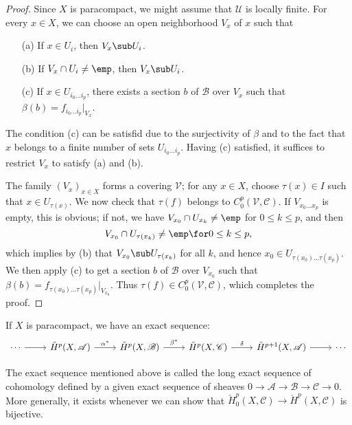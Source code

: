 \begin{proof}
Since $X$ is paracompact, we might assume that $\mathcal{U}$ is locally finite. For every $x\in X$, we can choose an open neighborhood $V_x$ of $x$ such that
\begin{itemize}
\item[(a)] If $x\in U_i$, then $V_x\sub U_i$.
\item[(b)] If $V_x\cap U_i\neq\emp$, then $V_x\sub U_i$.
\item[(c)] If $x\in U_{i_0\dots i_p}$, there exists a section $b$ of $\mathscr{B}$ over $V_x$ such that $\beta(b)=f_{i_0\dots i_p}|_{V_x}$.
\end{itemize}
The condition (c) can be satisfid due to the surjectivity of $\beta$ and to the fact that $x$ belongs to a finite number of sets $U_{i_0\dots i_p}$. Having (c) satisfied, it suffices to restrict $V_x$ to satisfy (a) and (b).\par
The family $(V_x)_{x\in X}$ forms a covering $\mathcal{V}$; for any $x\in X$, choose $\tau(x)\in I$ such that $x\in U_{\tau(x)}$. We now check that $\tau(f)$ belongs to $C^p_0(\mathcal{V},\mathscr{C})$. If $V_{x_0\dots x_p}$ is empty, this is obvious; if not, we have $V_{x_0}\cap U_{x_k}\neq\emp$ for $0\leq k\leq p$, and then
\[V_{x_0}\cap U_{\tau(x_k)}\neq\emp\for 0\leq k\leq p,\] 
which implies by (b) that $V_{x_0}\sub U_{\tau(x_k)}$ for all $k$, and hence $x_0\in U_{\tau(x_0)\dots\tau(x_p)}$. We then apply (c) to get a section $b$ of $\mathscr{B}$ over $V_{x_0}$ such that $\beta(b)=f_{\tau(x_0)\dots\tau(x_p)}|_{V_{x_0}}$. Thus $\tau(f)\in C^p_0(\mathcal{V},\mathscr{C})$, which completes the proof.
\end{proof}
\begin{corollary}\label{Cech long exact seq paracompact}
If $X$ is paracompact, we have an exact sequence:
\[\begin{tikzcd}
\cdots\ar[r]&\check{H}^p(X,\mathscr{A})\ar[r,"\alpha^*"]&\check{H}^p(X,\mathscr{B})\ar[r,"\beta^*"]&\check{H}^p(X,\mathscr{C})\ar[r,"\delta"]&\check{H}^{p+1}(X,\mathscr{A})\ar[r]&\cdots
\end{tikzcd}\]
\end{corollary}
The exact sequence mentioned above is called the long exact sequence of cohomology defined by a given exact sequence of sheaves $0\to\mathscr{A}\to\mathscr{B}\to\mathscr{C}\to 0$. More generally, it exists whenever we can show that $\check{H}^p_0(X,\mathscr{C})\to\check{H}^p(X,\mathscr{C})$ is bijective.
